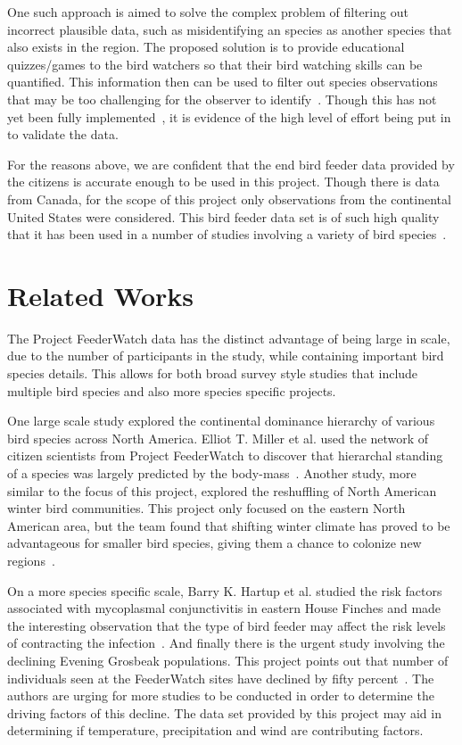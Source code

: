 One such approach is aimed to solve the complex problem of filtering out incorrect plausible data, such as misidentifying an species as another species that also exists in the region. The proposed solution is to provide educational quizzes/games to the bird watchers so that their bird watching skills can be quantified. This information then can be used to filter out species observations that may be too challenging for the observer to identify~\cite{bonter2012data}. Though this has not yet been fully implemented~\cite{BirdQuizzes:online}, it is evidence of the high level of effort being put in to validate the data.

For the reasons above, we are confident that the end bird feeder data provided by the citizens is accurate enough to be used in this project. Though there is data from Canada, for the scope of this project only observations from the continental United States were considered. This bird feeder data set is of such high quality that it has been used in a number of studies involving a variety of bird species~\cite{PFWPubs:online}.

\section{Related Works}

The Project FeederWatch data has the distinct advantage of being large in scale, due to the  number of participants in the study, while containing important bird species details. This allows for both broad survey style studies that include multiple bird species and also more species specific projects.

One large scale study explored the continental dominance hierarchy of various bird species across North America. Elliot T. Miller et al. used the network of citizen scientists from Project FeederWatch to discover that hierarchal standing of a species was largely predicted by the body-mass~\cite{miller2017fighting}. Another study, more similar to the focus of this project, explored the reshuffling of North American winter bird communities. This project only focused on the eastern North American area, but the team found that shifting winter climate has proved to be advantageous for smaller bird species, giving them a chance to colonize new regions~\cite{prince2015climate}.

On a more species specific scale, Barry K. Hartup et al. studied the risk factors associated with mycoplasmal conjunctivitis in eastern House Finches and made the interesting observation that the type of bird feeder may affect the risk levels of contracting the infection~\cite{hartup1998risk}. And finally there is the urgent study involving the declining Evening Grosbeak populations. This project points out that number of individuals seen at the FeederWatch sites have declined by fifty percent~\cite{bonter2008winter}. The authors are urging for more studies to be conducted in order to determine the driving factors of this decline. The data set provided by this project may aid in determining if temperature, precipitation and wind are contributing factors.



